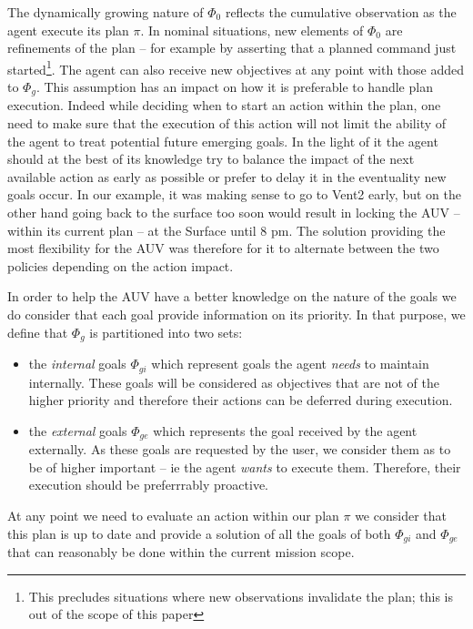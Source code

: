 The dynamically growing nature of $\Phi_0$ reflects the cumulative
observation as the agent execute its plan $\pi$. In nominal situations,
new elements of $\Phi_0$ are refinements of the plan -- for example by
asserting that a planned command just started\footnote{This precludes
  situations where new observations invalidate the plan; this is out
  of the scope of this paper}. The agent can also receive new
objectives at any point with those added to $\Phi_g$. This assumption
has an impact on how it is preferable to handle plan execution. Indeed
while deciding when to start an action within the plan, one need to
make sure that the execution of this action will not limit the ability
of the agent to treat potential future emerging goals. In the light of
it the agent should at the best of its knowledge try to balance the
impact of the next available action as early as possible or prefer to
delay it in the eventuality new goals occur. In our example, it was
making sense to go to Vent2 early, but on the other hand going back to
the surface too soon would result in locking the AUV -- within its
current plan -- at the Surface until $8$ pm. The solution providing
the most flexibility for the AUV was therefore for it to alternate
between the two policies depending on the action impact.

In order to help the AUV have a better knowledge on the nature of the
goals we do consider that each goal provide information on its
priority. In that purpose, we define that $\Phi_g$ is partitioned into
two sets:

\begin{itemize}

\item the \emph{internal} goals $\Phi_{gi}$ which represent goals the
  agent {\em needs} to maintain internally. These goals will be
  considered as objectives that are not of the higher priority and
  therefore their actions can be deferred during execution.

\item the \emph{external} goals $\Phi_{ge}$ which represents the goal
  received by the agent externally. As these goals are requested by
  the user, we consider them as to be of higher important -- ie the
  agent {\em wants} to execute them. Therefore, their execution should
  be preferrrably proactive.

\end{itemize}

At any point we need to evaluate an action within our plan $\pi$ we
consider that this plan is up to date and provide a solution of all 
the goals of both $\Phi_{gi}$ and $\Phi_{ge}$ that can reasonably be
done within the current mission scope.

